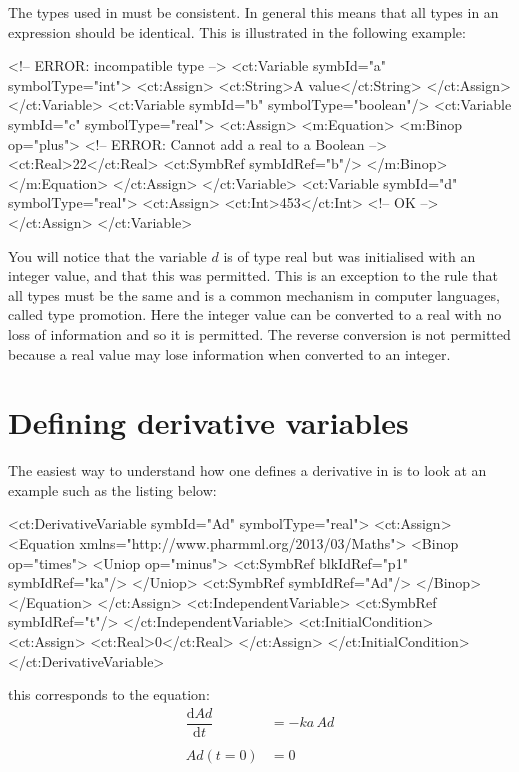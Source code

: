 The types used in \pharmml must be consistent. In general this means that
all types in an expression should be identical. This is illustrated in
the following example:
%
\begin{xmlcode}
<!-- ERROR: incompatible type -->
<ct:Variable symbId="a" symbolType="int">
    <ct:Assign>
        <ct:String>A value</ct:String>
    </ct:Assign>
</ct:Variable>
<ct:Variable symbId="b" symbolType="boolean"/>
<ct:Variable symbId="c" symbolType="real">
    <ct:Assign>
        <m:Equation>
            <m:Binop op="plus"> <!-- ERROR: Cannot add a real to a Boolean -->
                <ct:Real>22</ct:Real>
                <ct:SymbRef symbIdRef="b"/>
            </m:Binop>
        </m:Equation>
    </ct:Assign>
</ct:Variable>
<ct:Variable symbId="d" symbolType="real">
    <ct:Assign>
        <ct:Int>453</ct:Int> <!-- OK -->
    </ct:Assign>
</ct:Variable>
\end{xmlcode}
%
You will notice that the variable $d$ is of type real but was
initialised with an integer value, and that this was permitted. This
is an exception to the rule that all types must be the same and is
a common mechanism in computer languages, called type promotion. Here
the integer value can be converted to a real with no loss of
information and so it is permitted. The reverse conversion is not
permitted because a real value may lose information when converted to
an integer.

\section{Defining derivative variables}
\label{sec:odes}

The easiest way to understand how one defines a derivative in \pharmml
is to look at an example such as the listing
below:
%
\begin{xmlcode}
<ct:DerivativeVariable symbId="Ad" symbolType="real">
    <ct:Assign>
        <Equation xmlns="http://www.pharmml.org/2013/03/Maths">
            <Binop op="times">
                <Uniop op="minus">
                    <ct:SymbRef blkIdRef="p1" symbIdRef="ka"/>
                </Uniop>
                <ct:SymbRef symbIdRef="Ad"/>
            </Binop>
        </Equation>
    </ct:Assign>
    <ct:IndependentVariable>
        <ct:SymbRef symbIdRef="t"/>
    </ct:IndependentVariable>
    <ct:InitialCondition>
        <ct:Assign>
            <ct:Real>0</ct:Real>
        </ct:Assign>
    </ct:InitialCondition>
</ct:DerivativeVariable>
\end{xmlcode}
%
this corresponds to the equation:
%
\begin{align*}
\dfrac{\mathrm{d}\mathit{Ad}}{\mathrm{d}t}  &=  -\mathit{ka}\,  \mathit{Ad}\\
\\
\textit{Ad}(t=0)  &=  0
\end{align*}

